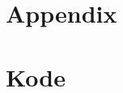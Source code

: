 \documentclass[reprint, english,notitlepage]{revtex4-1}  %
\begin{document}
\section{Appendix}


\section{Kode}

% 
%
% 
\end{document}
